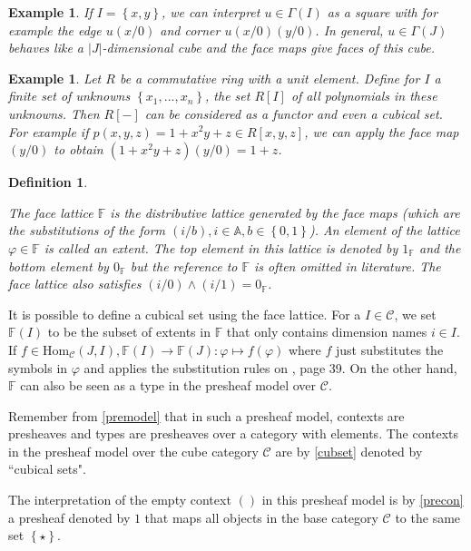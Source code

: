 \documentclass[12pt,a4paper,twoside,xetex]{book}
\newcommand{\keyword}[1]{\emph{#1}\index{#1}}
\newtheorem{definition}[theorem]{Definition}
\newtheorem{example}[theorem]{Example}
\newcommand{\singleton}[0]{\left\{ \star \right\}}
\newcommand{\homo}[3]{\text{Hom}_{#1}\left(#2,#3\right)}
\begin{document}
\begin{example}
If $I = \left\{x,y \right\}$, we can interpret $u \in \Gamma(I)$ as a square with for example the edge $u(x/0)$ and corner $u(x/0)(y/0)$. In general, $u\in \Gamma (J)$ behaves like a $|J|$-dimensional cube and the face maps give faces of this cube.
\end{example}

\begin{example}
Let $R$ be a commutative ring with a unit element. Define for $I$ a finite set of unknowns $\left\{x_1 , ..., x_n \right\}$, the set $R[I]$ of all polynomials in these unknowns. Then $R[-]$ can be considered as a functor and even a cubical set. For example if $p(x,y,z) = 1 + x^2y +z \in R[x,y,z]$, we can apply the face map $(y/0)$ to obtain $(1+x^2 y +z ) (y/0) = 1+z$.
\end{example}


\begin{definition}\label{facelattice}

The \keyword{face lattice} $\mathbb{F}$ is the distributive lattice generated by the face maps (which are the substitutions of the form $(i/b), i\in \mathbb{A}, b \in \left\{ 0,1 \right\}$). An element of the lattice $\varphi \in \mathbb{F}$ is called an \keyword{extent}. The top element in this lattice is denoted by $1_{\mathbb{F}}$ and the bottom element by $0_{\mathbb{F}}$ but the reference to $\mathbb{F}$ is often omitted in literature. The face lattice also satisfies $(i/0) \wedge (i/1) = 0_{\mathbb{F}}$. 
\end{definition}


It is possible to define a cubical set using the face lattice. For a $I\in \mathcal{C}$, we set $\mathbb{F}(I)$ to be the subset of extents in $\mathbb{F}$ that only contains dimension names $i \in I$. If $f \in \homo{\mathcal{C}}{J}{I}, \mathbb{F}(I) \rightarrow \mathbb{F}(J): \varphi \mapsto f(\varphi)$ where $f$ just substitutes the symbols in $\varphi$ and applies the substitution rules on \cite{Orton2019}, page 39. On the other hand, $\mathbb{F}$ can also be seen as a type in the presheaf model over $\mathcal{C}$. 

Remember from \cref{premodel} that in such a presheaf model, contexts are presheaves and types are presheaves over a category with elements. The contexts in the presheaf model over the cube category $\mathcal{C}$ are by \cref{cubset} denoted by ``cubical sets".

The interpretation of the empty context $()$ in this presheaf model is by \cref{precon} a presheaf denoted by $1$ that maps all objects in the base category $\mathcal{C}$ to the same set $\singleton$. 
\end{document}
